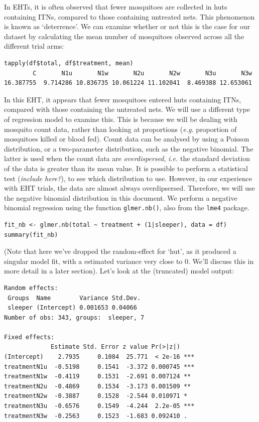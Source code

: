 \documentclass[11pt]{article}
\begin{document}
In EHTs, it is often observed that fewer mosquitoes are collected in huts containing ITNs, compared to those containing untreated nets. This phenomenon is known as `deterrence'. We can examine whether or not this is the case for our dataset by calculating the mean number of mosquitoes observed across all the different trial arms:
\begin{verbatim}
tapply(df$total, df$treatment, mean)
        C       N1u       N1w       N2u       N2w       N3u       N3w 
16.387755  9.714286 10.836735 10.061224 11.102041  8.469388 12.653061 
\end{verbatim}
In this EHT, it appears that fewer mosquitoes entered huts containing ITNs, compared with those containing the untreated nets. 
We will use a different type of regression model to examine this. This is because we will be dealing with mosquito count data, rather than looking at proportions (\textit{e.g.} proportion of mosquitoes killed or blood fed). Count data can be analysed by using a Poisson distribution, or a two-parameter distribution, such as the negative binomial. The latter is used when the count data are \textit{overdispersed}, \textit{i.e.} the standard deviation of the data is greater than its mean value. It is possible to perform a statistical test (\textit{include here?}), to see which distribution to use. However, in our experience with EHT trials, the data are almost always overdipsersed. Therefore, we will use the negative binomial distribution in this document. We perform a negative binomial regression using the function \verb+glmer.nb()+, also from the \verb+lme4+ package.
\begin{verbatim}
fit_nb <- glmer.nb(total ~ treatment + (1|sleeper), data = df)
summary(fit_nb)
\end{verbatim}
(Note that here we've dropped the random-effect for `hut', as it produced a singular model fit, with a estimated variance very close to 0. We'll discuss this in more detail in a later section). Let's look at the (truncated) model output:
\begin{verbatim}
Random effects:
 Groups  Name        Variance Std.Dev.
 sleeper (Intercept) 0.001653 0.04066 
Number of obs: 343, groups:  sleeper, 7

Fixed effects:
             Estimate Std. Error z value Pr(>|z|)    
(Intercept)    2.7935     0.1084  25.771  < 2e-16 ***
treatmentN1u  -0.5198     0.1541  -3.372 0.000745 ***
treatmentN1w  -0.4119     0.1531  -2.691 0.007124 ** 
treatmentN2u  -0.4869     0.1534  -3.173 0.001509 ** 
treatmentN2w  -0.3887     0.1528  -2.544 0.010971 *  
treatmentN3u  -0.6576     0.1549  -4.244  2.2e-05 ***
treatmentN3w  -0.2563     0.1523  -1.683 0.092410 .  
\end{verbatim}
\end{document}

